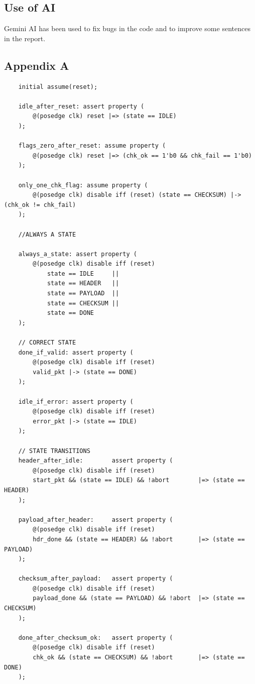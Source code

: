 \documentclass{article}
\begin{document}
\subsection{Use of AI}
Gemini AI has been used to fix bugs in the code and to improve some sentences in the report.
\subsection{Appendix A}\label{sec:appa}


\begin{verbatim}
    initial assume(reset);

    idle_after_reset: assert property (
        @(posedge clk) reset |=> (state == IDLE)
    );

    flags_zero_after_reset: assume property (
        @(posedge clk) reset |=> (chk_ok == 1'b0 && chk_fail == 1'b0)
    );
    
    only_one_chk_flag: assume property (
        @(posedge clk) disable iff (reset) (state == CHECKSUM) |-> (chk_ok != chk_fail)
    );

    //ALWAYS A STATE

    always_a_state: assert property (
        @(posedge clk) disable iff (reset) 
            state == IDLE     ||
            state == HEADER   ||
            state == PAYLOAD  ||
            state == CHECKSUM ||
            state == DONE
    );

    // CORRECT STATE
    done_if_valid: assert property (
        @(posedge clk) disable iff (reset) 
        valid_pkt |-> (state == DONE)
    );

    idle_if_error: assert property (
        @(posedge clk) disable iff (reset) 
        error_pkt |-> (state == IDLE)
    );

    // STATE TRANSITIONS
    header_after_idle:        assert property (
        @(posedge clk) disable iff (reset) 
        start_pkt && (state == IDLE) && !abort        |=> (state == HEADER)
    );

    payload_after_header:     assert property (
        @(posedge clk) disable iff (reset) 
        hdr_done && (state == HEADER) && !abort       |=> (state == PAYLOAD)
    );

    checksum_after_payload:   assert property (
        @(posedge clk) disable iff (reset) 
        payload_done && (state == PAYLOAD) && !abort  |=> (state == CHECKSUM)
    );

    done_after_checksum_ok:   assert property (
        @(posedge clk) disable iff (reset) 
        chk_ok && (state == CHECKSUM) && !abort       |=> (state == DONE)
    );


\end{verbatim}
\end{document}
